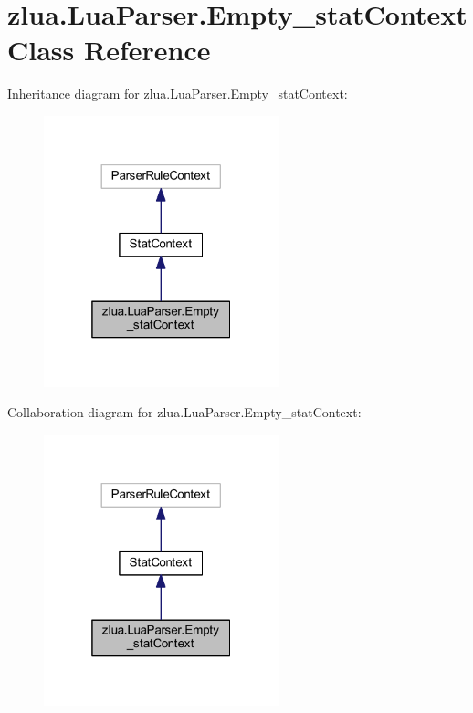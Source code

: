 \hypertarget{classzlua_1_1_lua_parser_1_1_empty__stat_context}{}\section{zlua.\+Lua\+Parser.\+Empty\+\_\+stat\+Context Class Reference}
\label{classzlua_1_1_lua_parser_1_1_empty__stat_context}


Inheritance diagram for zlua.\+Lua\+Parser.\+Empty\+\_\+stat\+Context\+:
\nopagebreak
\begin{figure}[H]
\begin{center}
\leavevmode
\includegraphics[width=193pt]{classzlua_1_1_lua_parser_1_1_empty__stat_context__inherit__graph}
\end{center}
\end{figure}


Collaboration diagram for zlua.\+Lua\+Parser.\+Empty\+\_\+stat\+Context\+:
\nopagebreak
\begin{figure}[H]
\begin{center}
\leavevmode
\includegraphics[width=193pt]{classzlua_1_1_lua_parser_1_1_empty__stat_context__coll__graph}
\end{center}
\end{figure}
